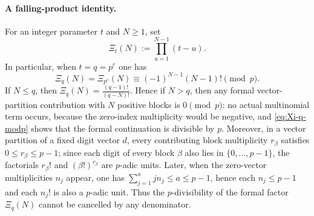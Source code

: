 \documentclass[11pt]{amsart}
\numberwithin{equation}{section}
\begin{document}
\paragraph{A falling-product identity.}
For an integer parameter $t$ and $N\ge1$, set
\begin{equation}\label{eq:Xi-def}
        \Xi_t(N):=\prod_{u=1}^{N-1}(t-u).
\end{equation}
In particular, when $t=q=p^e$ one has
\begin{equation}\label{eq:Xi-q-modp}
        \Xi_q(N)=\Xi_{p^e}(N)\equiv (-1)^{N-1}(N-1)!\pmod p.
\end{equation}
If $N\le q$, then $\Xi_q(N)=\frac{(q-1)!}{(q-N)!}$.  Hence if $N>q$, then any formal vector-partition contribution with $N$ positive blocks is $0\pmod p$: no actual multinomial term occurs, because the zero-index multiplicity would be negative, and \eqref{eq:Xi-q-modp} shows that the formal continuation is divisible by $p$.  Moreover, in a vector partition of a fixed digit vector $d$, every contributing block multiplicity $r_\beta$ satisfies $0\le r_\beta\le p-1$; since each digit of every block $\beta$ also lies in $\{0,\ldots,p-1\}$, the factorials $r_\beta!$ and $(\beta!)^{r_\beta}$ are $p$-adic units.  Later, when the zero-vector multiplicities $n_j$ appear, one has $\sum_{j=1}^a jn_j\le a\le p-1$, hence each $n_j\le p-1$ and each $n_j!$ is also a $p$-adic unit.  Thus the $p$-divisibility of the formal factor $\Xi_q(N)$ cannot be cancelled by any denominator.
\end{document}
